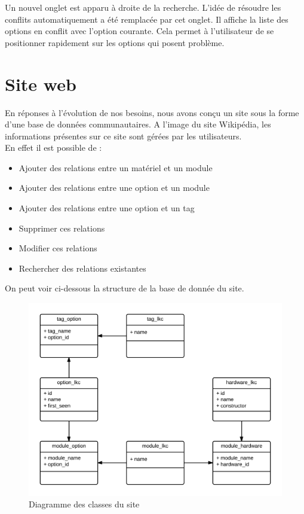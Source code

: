 \documentclass[16pts]{report}
\begin{document}
\begin{enumerate}
	Un nouvel onglet est apparu à droite de la recherche. L'idée de résoudre 
	les conflits automatiquement a été remplacée par cet onglet. Il affiche 
	la liste des options en conflit avec l'option courante. Cela permet à 
	l'utilisateur de se positionner rapidement sur les options qui posent 
	problème. 
	\\
\end{enumerate}

	\newpage
    \section{Site web}
    \label{sec:Site web}

    En réponses à l'évolution de nos besoins, nous avons conçu un site sous 
    la forme d'une base de données communautaires. A l'image du site 
    Wikipédia, les informations présentes sur ce site sont gérées par 
    les utilisateurs.\\

    En effet il est possible de : \\

    \begin{itemize}
        \item Ajouter des relations entre un matériel et un module
        \item Ajouter des relations entre une option et un module
        \item Ajouter des relations entre une option et un tag
        \item Supprimer ces relations
        \item Modifier ces relations
        \item Rechercher des relations existantes
    \end{itemize} 

    On peut voir ci-dessous la structure de la base de donnée du site. \\

    \begin{figure}[H]
        \includegraphics[scale=0.2]{./illustrations/diagramme_classes_site.png}
        \centering
        \caption{Diagramme des classes du site}
        \label{fig:DiagSite}
    \end{figure}
\end{document}
